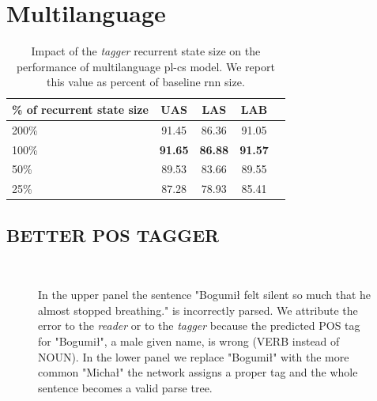 \section{Multilanguage}
\begin{table}[!htbp]
    \centering
    \begin{tabular}{l c c c c}
        \% of recurrent state size & UAS & LAS & LAB \\ \hline 
        200\% & 91.45 & 86.36& 91.05 \\
        100\% & \textbf{91.65} & \textbf{86.88} & \textbf{91.57}\\
        50\% & 89.53 & 83.66 & 89.55 \\
        25\% & 87.28 & 78.93 & 85.41
    \end{tabular}
    \label{tab:birnn_multi_size}
    \caption{Impact of the \emph{tagger} recurrent state size on the performance
    of multilanguage pl-cs model.
    We report this value as percent of baseline rnn size.}
\end{table}

\subsection{BETTER POS TAGGER}
\begin{figure}[t]
  \centering
  \\[5pt]
  \label{fig:pos_bad_good}
  \caption{In the upper panel the sentence "Bogumił felt silent so
    much that he almost stopped breathing." is incorrectly parsed.
    We attribute the error to the \emph{reader} or to the \emph{tagger} because the predicted POS
    tag for "Bogumił", a male given name, is wrong (VERB instead of
    NOUN). In the lower panel we replace "Bogumił" with the  more common "Michał" the network assigns
    a proper tag and the whole sentence becomes a valid parse tree.} 
\end{figure}
